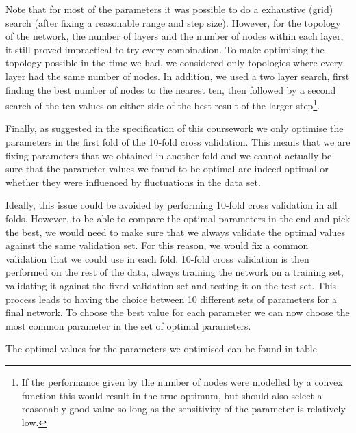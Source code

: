 \documentclass[10pt,a4paper]{article}
\begin{document}
Note that for most of the parameters it was possible to do a exhaustive (grid) search (after fixing a reasonable range and step size). However, for the topology of the network, the number of layers and the number of nodes within each layer, it still proved impractical to try every combination. To make optimising the topology possible in the time we had, we considered only topologies where every layer had the same number of nodes. In addition, we used a two layer search, first finding the best number of nodes to the nearest ten, then followed by a second search of the ten values on either side of the best result of the larger step\footnote{If the performance given by the number of nodes were modelled by a convex function this would result in the true optimum, but should also select a reasonably good value so long as the sensitivity of the parameter is relatively low.}.

Finally, as suggested in the specification of this coursework we only optimise the parameters in the first fold of the 10-fold cross validation. This means that we are fixing parameters that we obtained in another fold and we cannot actually be sure that the parameter values we found to be optimal are indeed optimal or whether they were influenced by fluctuations in the data set.

Ideally, this issue could be avoided by performing 10-fold cross validation in all folds. However, to be able to compare the optimal parameters in the end and pick the best, we would need to make sure that we always validate the optimal values against the same validation set. For this reason, we would fix a common validation that we could use in each fold. 10-fold cross validation is then performed on the rest of the data, always training the network on a training set, validating it against the fixed validation set and testing it on the test set. This process leads to having the choice between 10 different sets of parameters for a final network. To choose the best value for each parameter we can now choose the most common parameter in the set of optimal parameters.

The optimal values for the parameters we optimised can be found in table \
\end{document}
